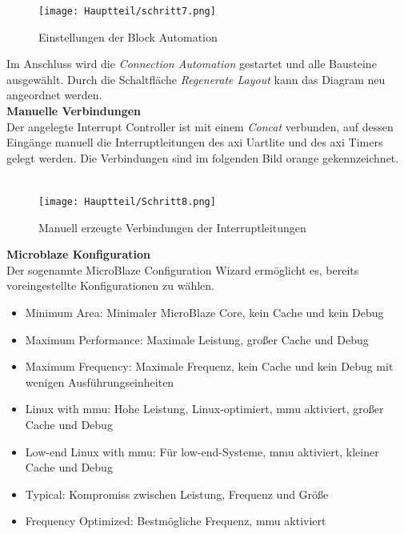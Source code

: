 \begin{figure}[H]
\centering
\texttt{[image: Hauptteil/schritt7.png]}
\caption{Einstellungen der Block Automation}\label{fig:mbschritt7}
\end{figure}


Im Anschluss wird die \emph{Connection Automation} gestartet und alle Bausteine ausgewählt.
Durch die Schaltfläche \emph{Regenerate Layout} kann das Diagram neu angeordnet werden.\\

\textbf{Manuelle Verbindungen}\\

Der angelegte Interrupt Controller ist mit einem \emph{Concat} verbunden, auf dessen Eingänge manuell die Interruptleitungen des \ac{axi} Uartlite und des \ac{axi} Timers gelegt werden.
Die Verbindungen sind im folgenden Bild orange gekennzeichnet.\\\\

\begin{figure}[H]
\centering
\texttt{[image: Hauptteil/Schritt8.png]}
\caption{Manuell erzeugte Verbindungen der Interruptleitungen}\label{fig:mbschritt8}
\end{figure}

\newpage

\textbf{Microblaze Konfiguration}\\

Der sogenannte MicroBlaze Configuration Wizard ermöglicht es, bereits voreingestellte Konfigurationen zu wählen.

\begin{itemize}
  \item Minimum Area: Minimaler MicroBlaze Core, kein Cache und kein Debug
  \item Maximum Performance: Maximale Leistung, großer Cache und Debug
  \item Maximum Frequency: Maximale Frequenz, kein Cache und kein Debug mit wenigen Ausführungseinheiten
  \item Linux with \ac{mmu}: Hohe Leistung, Linux-optimiert, \ac{mmu} aktiviert, großer Cache und Debug
  \item Low-end Linux with \ac{mmu}: Für low-end-Systeme, \ac{mmu} aktiviert, kleiner Cache und Debug
  \item Typical: Kompromiss zwischen Leistung, Frequenz und Größe
  \item Frequency Optimized: Bestmögliche Frequenz, \ac{mmu} aktiviert
\end{itemize}

